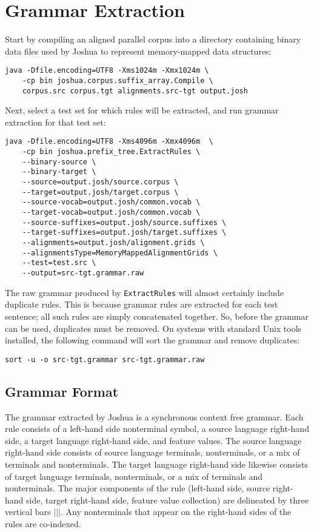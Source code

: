 \chapter{Grammar Extraction}
\label{ch:grammar-extraction}

Start by compiling an aligned parallel corpus into a directory containing binary data files used by Joshua to represent memory-mapped data structures:

\begin{verbatim}
java -Dfile.encoding=UTF8 -Xms1024m -Xmx1024m \
    -cp bin joshua.corpus.suffix_array.Compile \
    corpus.src corpus.tgt alignments.src-tgt output.josh
\end{verbatim}

Next, select a test set for which rules will be extracted, and run grammar extraction for that test set:

\begin{verbatim}
java -Dfile.encoding=UTF8 -Xms4096m -Xmx4096m  \
    -cp bin joshua.prefix_tree.ExtractRules \
    --binary-source \
    --binary-target \
    --source=output.josh/source.corpus \      
    --target=output.josh/target.corpus \      
    --source-vocab=output.josh/common.vocab \      
    --target-vocab=output.josh/common.vocab \  
    --source-suffixes=output.josh/source.suffixes \      
    --target-suffixes=output.josh/target.suffixes \
    --alignments=output.josh/alignment.grids \ 
    --alignmentsType=MemoryMappedAlignmentGrids \
    --test=test.src \
    --output=src-tgt.grammar.raw
\end{verbatim}

The raw grammar produced by {\tt ExtractRules} will almost certainly include duplicate rules. This is because grammar rules are extracted for each test sentence; all such rules are simply concatenated together. So, before the grammar can be used, duplicates must be removed. On systems with standard Unix tools installed, the following command will sort the grammar and remove duplicates:

\begin{verbatim}
sort -u -o src-tgt.grammar src-tgt.grammar.raw
\end{verbatim}

\section{Grammar Format}

The grammar extracted by Joshua is a synchronous context free grammar. Each rule consists of a left-hand side nonterminal symbol, a source language right-hand side, a target language right-hand side, and feature values. The source language right-hand side consists of source language terminals, nonterminals, or a mix of terminals and nonterminals. The target language right-hand side likewise consists of target language terminals, nonterminals, or a mix of terminals and nonterminals. The major components of the rule (left-hand side, source right-hand side, target right-hand side, feature value collection) are delineated by three vertical bars $|||$. Any nonterminals that appear on the right-hand sides of the rules are co-indexed.

